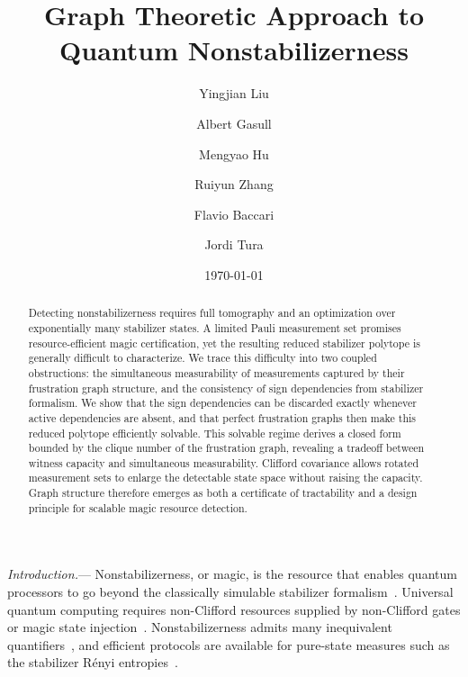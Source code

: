 \documentclass[10pt,aps,pra,twocolumn,floatfix,nofootinbib,superscriptaddress,longbibliography]{revtex4-2}
\begin{document}
	
	\title{Graph Theoretic Approach to Quantum Nonstabilizerness}
	
	\author{Yingjian Liu
		}
	\lorentz
	\aQa
	
	\author{Albert Gasull
		}
	\lorentz
	\aQa
	
	\author{Mengyao Hu
		}
	\cqt
	
	\author{Ruiyun Zhang
		}
	\hkust
	
	\author{Flavio Baccari
		}
	\padova
	
	\author{Jordi Tura
		}
	\lorentz
	\aQa
	
	\date{\today}
	
	\begin{abstract}
		Detecting nonstabilizerness requires full tomography and an optimization over exponentially many stabilizer states. A limited Pauli measurement set promises resource-efficient magic certification, yet the resulting reduced stabilizer polytope is generally difficult to characterize.
		We trace this difficulty into two coupled obstructions: the  simultaneous measurability of measurements captured by their frustration graph structure, and the consistency  of  sign dependencies from stabilizer formalism.
		We show that the sign dependencies can be discarded exactly whenever active dependencies are absent,  and that perfect frustration graphs then make this reduced polytope efficiently solvable.
		This solvable regime derives a closed form bounded by the clique number of the frustration graph, revealing a tradeoff between witness capacity and simultaneous measurability.
		Clifford covariance allows rotated measurement sets to enlarge the detectable state space without raising the capacity.
		Graph structure therefore emerges as both a certificate of tractability and a design principle for scalable magic resource detection.
	\end{abstract}
	
	\maketitle
	
	\emph{Introduction.}---
	\label{sec:intro}
	Nonstabilizerness, or magic, is the resource that enables quantum processors to go beyond the classically simulable stabilizer formalism~\cite{nielsen2010quantum}.
	Universal quantum computing requires non-Clifford resources supplied by non-Clifford gates or magic state injection~\cite{gottesman1997stabilizercodesquantumerror,shor1996faulttolerant,gottesman1999demonstrating,bravyi2005universal,wills2025constantoverhead,wang2019quantifyingmagicchannels,wang2020efficientbounds}.
	Nonstabilizerness admits many inequivalent quantifiers~\cite{veitch2012negative,howard2017application}, and efficient protocols are available for pure-state measures such as the stabilizer R\'enyi entropies~\cite{leone2022stabilizer,leone2024stabilizer,haug2023stabilizer}.
	
\end{document}

